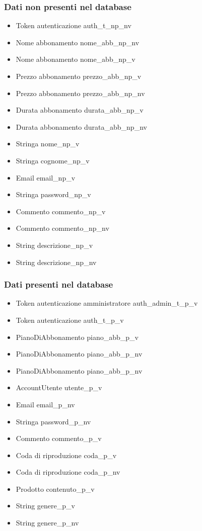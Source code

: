 \subsubsection{Dati non presenti nel database}
\begin{itemize}
    \item Token autenticazione auth\_t\_np\_nv
    \item Nome abbonamento nome\_abb\_np\_nv
    \item Nome abbonamento nome\_abb\_np\_v
    \item Prezzo abbonamento prezzo\_abb\_np\_v
    \item Prezzo abbonamento prezzo\_abb\_np\_nv
    \item Durata abbonamento durata\_abb\_np\_v
    \item Durata abbonamento durata\_abb\_np\_nv
    \item Stringa nome\_np\_v
    \item Stringa cognome\_np\_v
    \item Email email\_np\_v
    \item Stringa password\_np\_v
    \item Commento commento\_np\_v
    \item Commento commento\_np\_nv
    \item String descrizione\_np\_v
    \item String descrizione\_np\_nv

\end{itemize}

\subsubsection{Dati presenti nel database}
\begin{itemize}
    \item Token autenticazione amministratore auth\_admin\_t\_p\_v
    \item Token autenticazione auth\_t\_p\_v
    \item PianoDiAbbonamento piano\_abb\_p\_v
    \item PianoDiAbbonamento piano\_abb\_p\_nv
    \item PianoDiAbbonamento piano\_abb\_p\_nv
    \item AccountUtente utente\_p\_v
    \item Email email\_p\_nv
    \item Stringa password\_p\_nv
    \item Commento commento\_p\_v
    \item Coda di riproduzione coda\_p\_v
    \item Coda di riproduzione coda\_p\_nv
    \item Prodotto contenuto\_p\_v
    \item String genere\_p\_v
    \item String genere\_p\_nv

\end{itemize}

